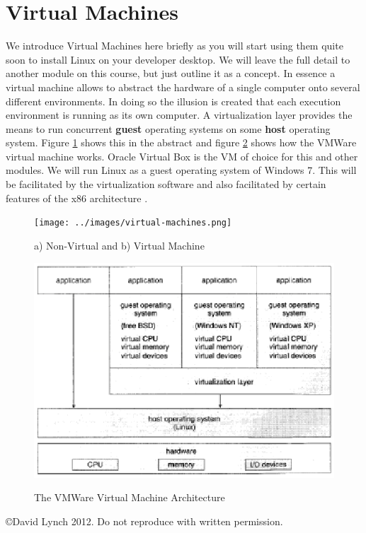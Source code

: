 \documentclass[10pt,a4paper]{article}
\begin{document}
\section{Virtual Machines}
We introduce Virtual Machines here briefly as you will start using them quite soon to install Linux on your developer desktop. We will leave the full detail to another module on this course, but just outline it as a concept. In essence a virtual machine allows to abstract the hardware of a single computer onto several different environments. In doing so the illusion is created that each execution environment is running as its own computer. A virtualization layer provides the means to run concurrent {\bf guest} operating systems on some {\bf host} operating system. Figure \ref{virtualmachines} shows this in the abstract and figure \ref{vmarch} shows how the VMWare virtual machine works. Oracle Virtual Box \cite{VIRTUALBOX} is the VM of choice for this and other modules. We will run Linux as a guest operating system of Windows 7. This will be facilitated by the virtualization software and also facilitated by certain features of the x86 architecture \cite{INTELSWDEV}.
\begin{figure}
\caption{a) Non-Virtual and b) Virtual Machine \cite{OSCONCEPTS}}
\begin{center}
\texttt{[image: ../images/virtual-machines.png]}
\label{virtualmachines}
\end{center}
\end{figure}
\begin{figure}
\caption{The VMWare Virtual Machine Architecture \cite{OSCONCEPTS}}
\begin{center}
\includegraphics[scale=0.45]{../images/vm-arch.png}
\label{vmarch}
\end{center}
\end{figure}





{}

\begin{center}
{\small \copyright  David Lynch 2012. Do not reproduce with written permission.}
\end{center}
\end{document}
